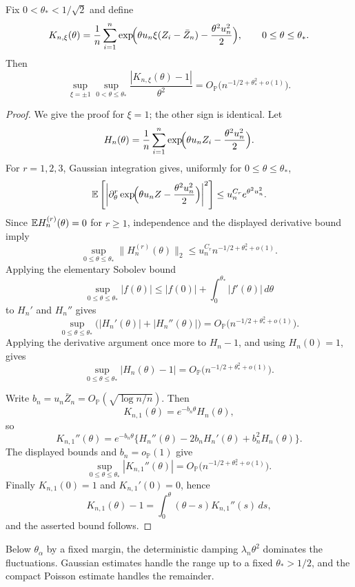 \begin{lemma}
\label{lem:gaussian-regime-centered}
Fix $0<\theta_*<1/\sqrt2$ and define
\[
    K_{n,\xi}(\theta)
    =
    \frac1n\sum_{i=1}^n
    \exp\!\Bigl(
        \theta u_n\xi(Z_i-\bar Z_n)-\frac{\theta^2u_n^2}{2}
    \Bigr),
    \qquad
    0\le\theta\le\theta_*.
\]
Then
\[
    \sup_{\xi=\pm1}\sup_{0<\theta\le\theta_*}
    \frac{|K_{n,\xi}(\theta)-1|}{\theta^2}
    =
    O_{\mathbb P}\bigl(n^{-1/2+\theta_*^2+o(1)}\bigr).
\]
\end{lemma}

\begin{proof}
We give the proof for $\xi=1$; the other sign is identical. Let
\[
    H_n(\theta)
    =
    \frac1n\sum_{i=1}^n
    \exp\!\Bigl(\theta u_nZ_i-\frac{\theta^2u_n^2}{2}\Bigr).
\]
For $r=1,2,3$, Gaussian integration gives, uniformly for $0\le\theta\le\theta_*$,
\[
    \mathbb{E}\left[
        \left|
        \partial_\theta^r
        \exp\!\Bigl(\theta u_nZ-\frac{\theta^2u_n^2}{2}\Bigr)
        \right|^2
    \right]
    \le
    u_n^{C_r}e^{\theta^2u_n^2}.
\]
Since $\mathbb{E} H_n^{(r)}(\theta)=0$ for $r\ge1$, independence and the displayed
derivative bound imply
\[
    \sup_{0\le\theta\le\theta_*}
    \|H_n^{(r)}(\theta)\|_2
    \le
    u_n^{C_r}n^{-1/2+\theta_*^2+o(1)}.
\]
Applying the elementary Sobolev bound
\[
    \sup_{0\le\theta\le\theta_*}|f(\theta)|
    \le
    |f(0)|+\int_0^{\theta_*}|f'(\theta)|\,d\theta
\]
to $H_n'$ and $H_n''$ gives
\[
    \sup_{0\le\theta\le\theta_*}
    \bigl(|H_n'(\theta)|+|H_n''(\theta)|\bigr)
    =
    O_{\mathbb P}\bigl(n^{-1/2+\theta_*^2+o(1)}\bigr).
\]
Applying the derivative argument once more to $H_n-1$, and using
$H_n(0)=1$, gives
\[
    \sup_{0\le\theta\le\theta_*}|H_n(\theta)-1|
    =
    O_{\mathbb P}\bigl(n^{-1/2+\theta_*^2+o(1)}\bigr).
\]

Write $b_n=u_n\bar Z_n=O_{\mathbb P}(\sqrt{\log n/n})$. Then
\[
    K_{n,1}(\theta)=e^{-b_n\theta}H_n(\theta),
\]
so
\[
    K_{n,1}''(\theta)
    =
    e^{-b_n\theta}
    \{H_n''(\theta)-2b_nH_n'(\theta)+b_n^2H_n(\theta)\}.
\]
The displayed bounds and $b_n=o_{\mathbb P}(1)$ give
\[
    \sup_{0\le\theta\le\theta_*}|K_{n,1}''(\theta)|
    =
    O_{\mathbb P}\bigl(n^{-1/2+\theta_*^2+o(1)}\bigr).
\]
Finally $K_{n,1}(0)=1$ and $K_{n,1}'(0)=0$, hence
\[
    K_{n,1}(\theta)-1
    =
    \int_0^\theta(\theta-s)K_{n,1}''(s)\,ds,
\]
and the asserted bound follows.
\end{proof}

Below \(\theta_\alpha\) by a fixed margin, the deterministic damping
\(\lambda_n\theta^2\) dominates the fluctuations. Gaussian estimates handle
the range up to a fixed $\theta_*>1/2$, and the compact Poisson estimate
handles the remainder.

